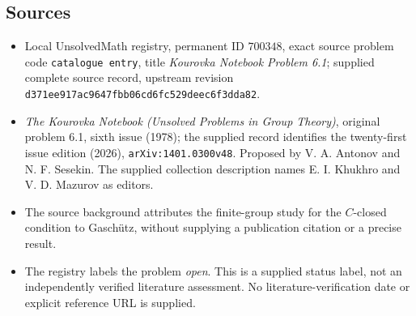 \documentclass[11pt]{article}
\begin{document}
\subsection{Sources}
\begin{itemize}
\item Local UnsolvedMath registry, permanent ID \(700348\), exact source problem code \texttt{catalogue entry}, title \emph{Kourovka Notebook Problem 6.1}; supplied complete source record, upstream revision \texttt{d371ee917ac9647fbb06cd6fc529deec6f3dda82}.
\item \emph{The Kourovka Notebook (Unsolved Problems in Group Theory)}, original problem 6.1, sixth issue (1978); the supplied record identifies the twenty-first issue edition (2026), \texttt{arXiv:1401.0300v48}. Proposed by V. A. Antonov and N. F. Sesekin. The supplied collection description names E. I. Khukhro and V. D. Mazurov as editors.
\item The source background attributes the finite-group study for the \(C\)-closed condition to Gasch\"utz, without supplying a publication citation or a precise result.
\item The registry labels the problem \emph{open}. This is a supplied status label, not an independently verified literature assessment. No literature-verification date or explicit reference URL is supplied.
\end{itemize}
\end{document}
